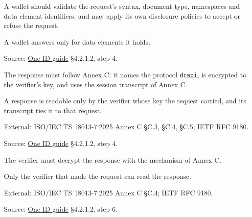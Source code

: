\begin{definition}
  \label{def:c58}
  A wallet should validate the request's syntax, document type, namespaces
  and data element identifiers, and may apply its own disclosure policies to
  accept or refuse the request.

  A wallet answers only for data elements it holds.

  Source:
  \href{https://standards.atlassian.net/wiki/spaces/OneID/pages/2947416082/Technical+Implementation+Guide}{One
  ID guide} §4.2.1.2, step 4.
\end{definition}

\begin{definition}
  \label{def:c59}
  The response must follow Annex C: it names the protocol \texttt{dcapi}, is
  encrypted to the verifier's key, and uses the session transcript of Annex
  C.

  A response is readable only by the verifier whose key the request carried,
  and its transcript ties it to that request.

  External: ISO/IEC TS 18013-7:2025 Annex C §C.3, §C.4, §C.5; IETF RFC 9180.

  Source:
  \href{https://standards.atlassian.net/wiki/spaces/OneID/pages/2947416082/Technical+Implementation+Guide}{One
  ID guide} §4.2.1.2, step 4.
\end{definition}

\begin{definition}
  \label{def:c61}
  The verifier must decrypt the response with the mechanism of Annex C.

  Only the verifier that made the request can read the response.

  External: ISO/IEC TS 18013-7:2025 Annex C §C.4; IETF RFC 9180.

  Source:
  \href{https://standards.atlassian.net/wiki/spaces/OneID/pages/2947416082/Technical+Implementation+Guide}{One
  ID guide} §4.2.1.2, step 6.
\end{definition}

